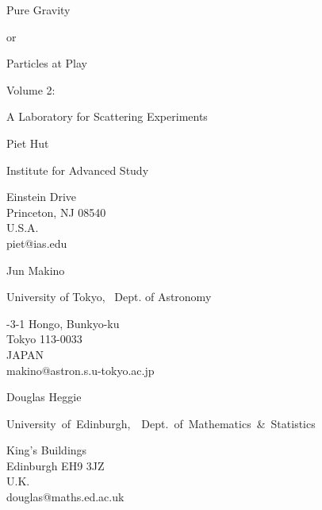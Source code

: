 
\thispagestyle{empty}                 %

\bigskip\bigskip
\begin{center}

{\lggggb Pure Gravity}

\medskip

{\lgb or}

\medskip

{\lggb Particles at Play}

\bigskip\bigskip\bigskip\bigskip\bigskip

{\lgb Volume 2:}

\bigskip

{\lggb A Laboratory for Scattering Experiments}

\bigskip\bigskip

{\lggr Piet Hut}

{\lgr Institute for Advanced Study}

{ Einstein Drive}\\
{\lr Princeton, NJ 08540}\\
{\lr U.S.A.}\\
{\lr piet@ias.edu}

\bigskip

{\lggr Jun Makino}

{\lgr University of Tokyo, \ Dept. of Astronomy}

{-3-1 Hongo, Bunkyo-ku}\\
{\lr Tokyo 113-0033}\\
{\lr JAPAN}\\
{\lr makino@astron.s.u-tokyo.ac.jp}

\bigskip

{\lggr Douglas Heggie}

\medskip
\hbox{{\lgr University of Edinburgh, \ Dept. of Mathematics \& Statistics}}

{\lr King's Buildings}\\
{\lr Edinburgh EH9 3JZ}\\
{\lr U.K.}\\
{\lr douglas@maths.ed.ac.uk}

\end{center}
